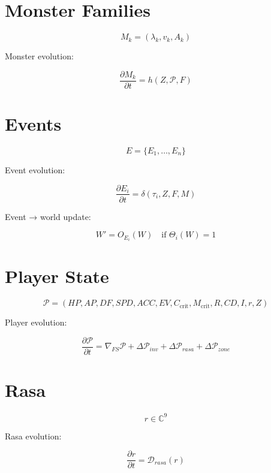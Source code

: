 \section*{Monster Families}

\[
M_k = (\lambda_k, v_k, A_k)
\]

Monster evolution:

\[
\frac{\partial M_k}{\partial t}
= h(Z, \mathcal{P}, F)
\]


\section*{Events}

\[
E = \{E_1, \ldots, E_n\}
\]

Event evolution:

\[
\frac{\partial E_i}{\partial t}
= \delta(\tau_i, Z, F, M)
\]

Event → world update:

\[
W' = O_{E_i}(W)
\quad \text{if } \Theta_i(W) = 1
\]


\section*{Player State}

\[
\mathcal{P}
= (HP, AP, DF, SPD, ACC, EV, C_{\text{crit}}, M_{\text{crit}},
R, CD, I, r, Z)
\]

Player evolution:

\[
\frac{\partial \mathcal{P}}{\partial t}
= \nabla_{FS}\mathcal{P}
+ \Delta\mathcal{P}_{inv}
+ \Delta\mathcal{P}_{rasa}
+ \Delta\mathcal{P}_{zone}
\]


\section*{Rasa}

\[
r \in \mathbb{C}^9
\]

Rasa evolution:

\[
\frac{\partial r}{\partial t}
= \mathcal{D}_{rasa}(r)
\]

